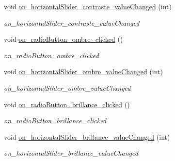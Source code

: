 \begin{DoxyCompactItemize}
\mbox{\label{classAppMainWindow_a62da52f18d62803f4ccf6322507b918c}} 
void \hyperlink{classAppMainWindow_a62da52f18d62803f4ccf6322507b918c}{on\+\_\+horizontal\+Slider\+\_\+contraste\+\_\+value\+Changed} (int)
\begin{DoxyCompactList}\small\item\em on\+\_\+horizontal\+Slider\+\_\+contraste\+\_\+value\+Changed \end{DoxyCompactList}\item 
\mbox{\label{classAppMainWindow_a92e81ef96a67355118357cb6ab94f0d9}} 
void \hyperlink{classAppMainWindow_a92e81ef96a67355118357cb6ab94f0d9}{on\+\_\+radio\+Button\+\_\+ombre\+\_\+clicked} ()
\begin{DoxyCompactList}\small\item\em on\+\_\+radio\+Button\+\_\+ombre\+\_\+clicked \end{DoxyCompactList}\item 
\mbox{\label{classAppMainWindow_ae8bdd8fb835d78149e82e6092ef4bb49}} 
void \hyperlink{classAppMainWindow_ae8bdd8fb835d78149e82e6092ef4bb49}{on\+\_\+horizontal\+Slider\+\_\+ombre\+\_\+value\+Changed} (int)
\begin{DoxyCompactList}\small\item\em on\+\_\+horizontal\+Slider\+\_\+ombre\+\_\+value\+Changed \end{DoxyCompactList}\item 
\mbox{\label{classAppMainWindow_af6ea50a2b74e6d9d1142c1505e83f74c}} 
void \hyperlink{classAppMainWindow_af6ea50a2b74e6d9d1142c1505e83f74c}{on\+\_\+radio\+Button\+\_\+brillance\+\_\+clicked} ()
\begin{DoxyCompactList}\small\item\em on\+\_\+radio\+Button\+\_\+brillance\+\_\+clicked \end{DoxyCompactList}\item 
\mbox{\label{classAppMainWindow_a97ec43262c96c703ac380393177c6e11}} 
void \hyperlink{classAppMainWindow_a97ec43262c96c703ac380393177c6e11}{on\+\_\+horizontal\+Slider\+\_\+brillance\+\_\+value\+Changed} (int)
\begin{DoxyCompactList}\small\item\em on\+\_\+horizontal\+Slider\+\_\+brillance\+\_\+value\+Changed \end{DoxyCompactList}\item 

\end{DoxyCompactItemize}
